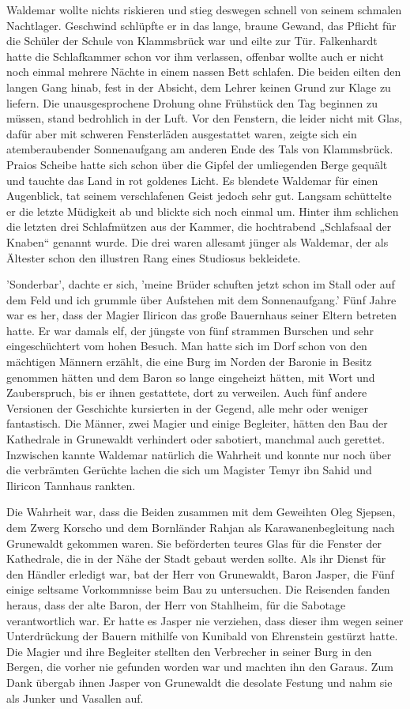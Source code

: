 Waldemar wollte nichts riskieren und stieg deswegen schnell von seinem schmalen Nachtlager. Geschwind schlüpfte er in das lange, braune Gewand, das Pflicht für die Schüler der Schule von Klammsbrück war und eilte zur Tür. Falkenhardt hatte die Schlafkammer schon vor ihm verlassen, offenbar wollte auch er nicht noch einmal mehrere Nächte in einem nassen Bett schlafen. Die beiden eilten den langen Gang hinab, fest in der Absicht, dem Lehrer keinen Grund zur Klage zu liefern. Die unausgesprochene Drohung ohne Frühstück den Tag beginnen zu müssen, stand bedrohlich in der Luft. Vor den Fenstern, die leider nicht mit Glas, dafür aber mit schweren Fensterläden ausgestattet waren, zeigte sich ein atemberaubender Sonnenaufgang am anderen Ende des Tals von Klammsbrück. Praios Scheibe hatte sich schon über die Gipfel der umliegenden Berge gequält und tauchte das Land in rot goldenes Licht. Es  blendete Waldemar für einen Augenblick, tat seinem verschlafenen Geist jedoch sehr gut. Langsam schüttelte er die letzte Müdigkeit ab und blickte sich noch einmal um. Hinter ihm schlichen die letzten drei Schlafmützen aus der Kammer, die hochtrabend „Schlafsaal der Knaben“ genannt wurde. Die drei waren allesamt jünger als Waldemar, der als Ältester schon den illustren Rang eines Studiosus bekleidete.

'Sonderbar', dachte er sich, 'meine Brüder schuften jetzt schon im Stall oder auf dem Feld und ich grummle über Aufstehen mit dem Sonnenaufgang.' Fünf Jahre war es her, dass der Magier Iliricon das große Bauernhaus seiner Eltern betreten hatte. Er war damals elf, der jüngste von fünf strammen Burschen und sehr eingeschüchtert vom hohen Besuch. Man hatte sich im Dorf schon von den mächtigen Männern erzählt, die eine Burg im Norden der Baronie in Besitz genommen hätten und dem Baron so lange eingeheizt hätten, mit Wort und Zauberspruch, bis er ihnen gestattete, dort zu verweilen. Auch fünf andere Versionen der Geschichte kursierten in der Gegend, alle mehr oder weniger fantastisch. Die Männer, zwei Magier und einige Begleiter, hätten den Bau der Kathedrale in Grunewaldt verhindert oder sabotiert, manchmal auch gerettet. Inzwischen kannte Waldemar natürlich die Wahrheit und konnte nur noch über die verbrämten Gerüchte lachen die sich um Magister Temyr ibn Sahid und Iliricon Tannhaus rankten.

Die Wahrheit war, dass die Beiden zusammen mit dem Geweihten Oleg Sjepsen, dem Zwerg Korscho und dem Bornländer Rahjan als Karawanenbegleitung nach Grunewaldt gekommen waren. Sie beförderten teures Glas für die Fenster der Kathedrale, die in der Nähe der Stadt gebaut werden sollte. Als ihr Dienst für den Händler erledigt war, bat der Herr von Grunewaldt, Baron Jasper, die Fünf einige seltsame Vorkommnisse beim Bau zu untersuchen. Die Reisenden fanden heraus, dass der alte Baron, der Herr von Stahlheim, für die Sabotage verantwortlich war. Er hatte es Jasper nie verziehen, dass dieser ihm wegen seiner Unterdrückung der Bauern mithilfe von Kunibald von Ehrenstein gestürzt hatte. Die Magier und ihre Begleiter stellten den Verbrecher in seiner Burg in den Bergen, die vorher nie gefunden worden war und machten ihn den Garaus. Zum Dank übergab ihnen Jasper von Grunewaldt die desolate Festung und nahm sie als Junker und Vasallen auf.

